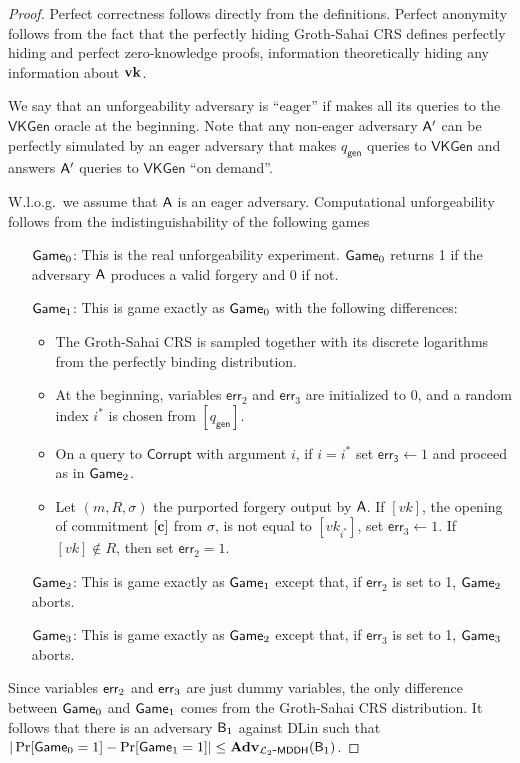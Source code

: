 \begin{proof}
Perfect correctness follows directly from the definitions. Perfect anonymity follows from the fact that the perfectly hiding Groth-Sahai CRS defines perfectly hiding and perfect zero-knowledge proofs, information theoretically hiding any information about $\mathbf{vk}$.

We say that an unforgeability adversary is ``eager'' if  makes all its queries to the $\mathsf{VKGen}$ oracle at the beginning. Note that any non-eager adversary $\mathsf{A}'$ can be perfectly simulated  by an eager adversary that makes ${q_\mathsf{gen}}$ queries to $\mathsf{VKGen}$ and answers $\mathsf{A}'$ queries to $\mathsf{VKGen}$ ``on demand''.

W.l.o.g.~we assume that $\mathsf{A}$ is an eager adversary. Computational unforgeability follows from the indistinguishability of the following games
\begin{itemize}
\item[$\mathsf{Game}_0$:] This is the real unforgeability experiment. $\mathsf{Game}_0$ returns 1 if the adversary $\mathsf{A}$ produces a valid forgery and 0 if not.
\item[$\mathsf{Game}_1$:] This is game exactly as $\mathsf{Game}_0$ with the following differences: 
    \begin{itemize}
    \item The Groth-Sahai CRS is sampled together with its discrete logarithms from the perfectly binding distribution.
    \item At the beginning, variables $\mathsf{err}_2$ and $\mathsf{err}_3$ are initialized to $0$, and a random index $i^*$ is chosen from $[{q_\mathsf{gen}}]$.
    \item On a query to $\mathsf{Corrupt}$ with argument $i$, if $i=i^*$ set $\mathsf{err_3}\gets 1$ and proceed as in $\mathsf{Game}_2$.
    \item Let $(m,R,\sigma)$ the purported forgery output by $\mathsf{A}$. If $[vk]$, the opening of commitment $[\mathbf{c}]$ from $\sigma$, is not equal to $[vk_{i^*}]$,  set $\mathsf{err}_3\gets 1$. If $[vk]\notin R$, then set $\mathsf{err}_2=1$.
    \end{itemize}
\item[$\mathsf{Game}_2$:] This is game exactly as $\mathsf{Game}_1$ except that, if $\mathsf{err}_2$ is set to 1, $\mathsf{Game}_2$ aborts.
\item[$\mathsf{Game}_3$:] This is game exactly as $\mathsf{Game}_2$ except that, if $\mathsf{err}_3$ is set to 1, $\mathsf{Game}_3$ aborts. 
\end{itemize}
Since variables $\mathsf{err}_2$ and $\mathsf{err}_3$ are just dummy variables, the only difference between $\mathsf{Game}_0$ and $\mathsf{Game}_1$ comes from the Groth-Sahai CRS distribution. It follows that there is an adversary $\mathsf{B}_{1}$ against DLin such that $|\Pr[\mathsf{Game}_0=1]-\Pr[\mathsf{Game}_1=1]|\leq \mathbf{Adv}_{\mathcal{L}_2\mbox{-}\mathsf{MDDH}}(\mathsf{B}_{1})$.


\end{proof}
